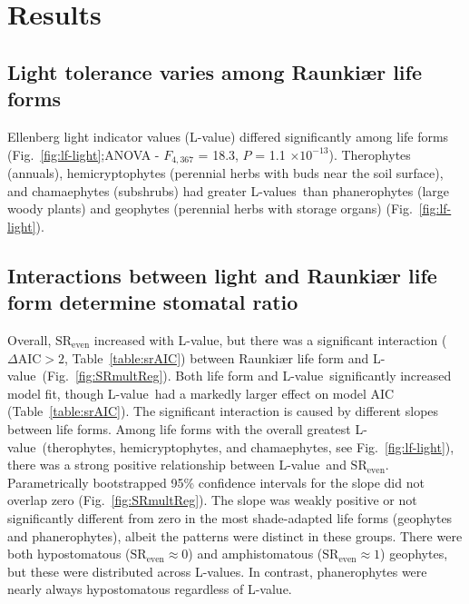 \documentclass[12pt, oneside]{article}
\newcommand{\el}{L-value}
\newcommand{\els}{L-values}
\begin{document}

\section*{Results}

\subsection*{Light tolerance varies among Raunki\ae r life forms}

Ellenberg light indicator values (\el) differed significantly among life forms (Fig.~\ref{fig:lf-light};ANOVA - $F_{4, 367}$ = 18.3, $P$ = 1.1 $\times10^{-13}$). Therophytes (annuals), hemicryptophytes (perennial herbs with buds near the soil surface), and chamaephytes (subshrubs) had greater \els~than phanerophytes (large woody plants) and geophytes (perennial herbs with storage organs) (Fig.~\ref{fig:lf-light}).

\subsection*{Interactions between light and Raunki\ae r life form determine stomatal ratio}

Overall, $\mathrm{SR_{even}}$ increased with \el, but there was a significant interaction ($\Delta\mathrm{AIC} > 2$, Table~\ref{table:srAIC}) between Raunki\ae r life form and \el~(Fig.~\ref{fig:SRmultReg}). Both life form and \el~significantly increased model fit, though \el~had a markedly larger effect on model AIC (Table~\ref{table:srAIC}). The significant interaction is caused by different slopes between life forms. Among life forms with the overall greatest \el~(therophytes, hemicryptophytes, and chamaephytes, see Fig.~\ref{fig:lf-light}), there was a strong positive relationship between \el~and $\mathrm{SR_{even}}$. Parametrically bootstrapped 95\% confidence intervals for the slope did not overlap zero (Fig.~\ref{fig:SRmultReg}). The slope was weakly positive or not significantly different from zero in the most shade-adapted life forms (geophytes and phanerophytes), albeit the patterns were distinct in these groups. There were both hypostomatous ($\mathrm{SR_{even}} \approx 0$) and amphistomatous ($\mathrm{SR_{even}} \approx 1$) geophytes, but these were distributed across \el s. In contrast, phanerophytes were nearly always hypostomatous regardless of \el. %
\end{document}
